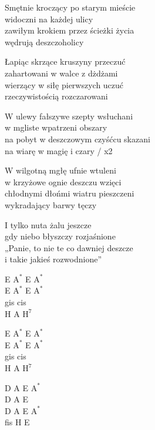 \begin{textn}
    Smętnie kroczący po starym mieście\\
    widoczni na każdej ulicy\\
    zawiłym krokiem przez ścieżki życia\\
    wędrują deszczoholicy

    Łapiąc skrzące kruszyny przeczuć\\
    zahartowani w walce z dżdżami\\
    wierzący w siłę pierwszych uczuć\\
    rzeczywistością rozczarowani

    W ulewy fałszywe szepty wsłuchani\\
    w mgliste wpatrzeni obszary\\
    na pobyt w deszczowym czyśćcu skazani\\
    na wiarę w magię i czary / x2

    W wilgotną mgłę ufnie wtuleni\\
    w krzyżowe ognie deszczu wzięci\\
    chłodnymi dłońmi wiatru pieszczeni\\
    wykradający barwy tęczy

    I tylko nuta żalu jeszcze\\
    gdy niebo błyszczy rozjaśnione\\
    „Panie, to nie te co dawniej deszcze\\
    i takie jakieś rozwodnione”
\end{textn}
\begin{chordw}
    E $\mathrm{A^{*}}$ E $\mathrm{A^{*}}$\\
    E $\mathrm{A^{*}}$ E $\mathrm{A^{*}}$\\
    gis cis\\
    H A $\mathrm{H^{7}}$

    E $\mathrm{A^{*}}$ E $\mathrm{A^{*}}$\\
    E $\mathrm{A^{*}}$ E $\mathrm{A^{*}}$\\
    gis cis\\
    H A $\mathrm{H^{7}}$

    D A E $\mathrm{A^{*}}$\\
    D A E\\
    D A E $\mathrm{A^{*}}$\\
    fis H E

\end{chordw}
